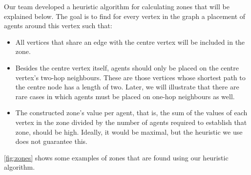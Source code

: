 Our team developed a heuristic algorithm for calculating zones that will be explained below.
The goal is to find for every vertex in the graph a placement of agents around this vertex such that:
\begin{itemize}
  \item All vertices that share an edge with the centre vertex will be included in the zone.
  \item Besides the centre vertex itself, agents should only be placed on the centre vertex's two-hop neighbours.
    These are those vertices whose shortest path to the centre node has a length of two.
    Later, we will illustrate that there are rare cases in which agents must be placed on one-hop neighbours as well.
  \item The constructed zone's value per agent, that is, the sum of the values of each vertex in the zone divided by the number of agents required to establish that zone, should be high.
        Ideally, it would be maximal, but the heuristic we use does not guarantee this.
\end{itemize}
\autoref{fig:zones} shows some examples of zones that are found using our heuristic algorithm.
